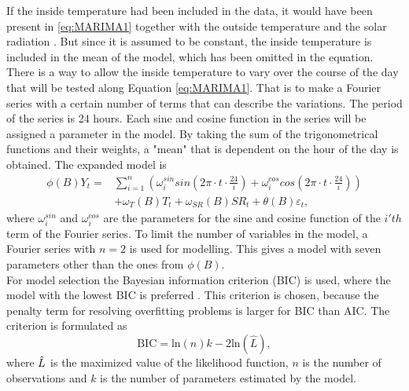 \noindent If the inside temperature had been included in the data, it would have been present in \cref{eq:MARIMA1} together with the outside temperature and the solar radiation \cite{peder}. But since it is assumed to be constant, the inside temperature is included in the mean of the model, which has been omitted in the equation. There is a way to allow the inside temperature to vary over the course of the day that will be tested along Equation \ref{eq:MARIMA1}. That is to make a Fourier series with a certain number of terms that can describe the variations. The period of the series is 24 hours. Each sine and cosine function in the series will be assigned a parameter in the model. By taking the sum of the trigonometrical functions and their weights, a "mean" that is dependent on the hour of the day is obtained. The expanded model is
\begin{align}
    \phi (B) Y_t = &\sum_{i=1}^n \left(\omega^{sin}_i sin\left(2\pi\cdot t \cdot \frac{24}{i}\right) + \omega^{cos}_i cos\left(2\pi\cdot t \cdot \frac{24}{i}\right)\right) \nonumber\\ & + \omega_{T}(B)T_t + \omega_{SR}(B)SR_t + \theta (B) \varepsilon_t ,
    \label{eq:MARIMA2}
\end{align}
where $\omega^{sin}_i$ and $\omega^{cos}_i$ are the parameters for the sine and cosine function of the $i'th$ term of the Fourier series. To limit the number of variables in the model, a Fourier series with $n=2$ is used for modelling. This gives a model with seven parameters other than the ones from $\phi(B)$. \\

\noindent For model selection the Bayesian information criterion (BIC) is used, where the model with the lowest BIC is preferred \cite{BIC}. This criterion is chosen, because the penalty term for resolving overfitting problems is larger for BIC than AIC. The criterion is formulated as
\begin{equation}
    \text{BIC} = \text{ln}(n)k - 2\text{ln}(\widehat{L}),
\end{equation}
where $\Hat{L}$ is the maximized value of the likelihood function, $n$ is the number of observations and $k$ is the number of parameters estimated by the model. \\

